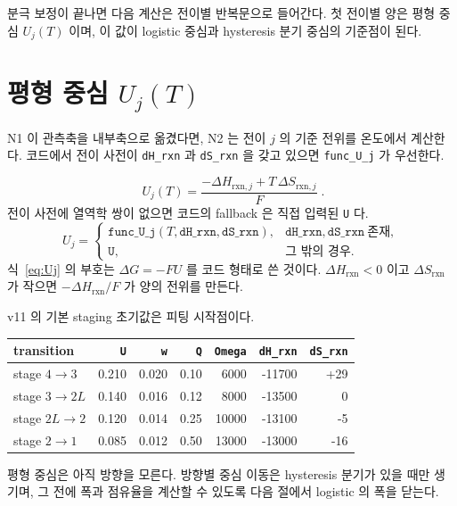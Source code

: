 \documentclass[11pt,a4paper]{article}
\begin{document}
분극 보정이 끝나면 다음 계산은 전이별 반복문으로 들어간다. 첫 전이별 양은 평형 중심 $U_j(T)$ 이며, 이 값이 logistic 중심과 hysteresis 분기 중심의 기준점이 된다.

\section{평형 중심 $U_j(T)$}\label{sec:n2}
N1 이 관측축을 내부축으로 옮겼다면, N2 는 전이 $j$ 의 기준 전위를 온도에서 계산한다. 코드에서 전이 사전이 \texttt{dH\_rxn} 과 \texttt{dS\_rxn} 을 갖고 있으면 \texttt{func\_U\_j} 가 우선한다.

\begin{equation}
\boxed{\;U_j(T)=\frac{-\Delta H_{\mathrm{rxn},j}+T\,\Delta S_{\mathrm{rxn},j}}{F}\;.}
\label{eq:Uj}
\end{equation}
전이 사전에 열역학 쌍이 없으면 코드의 fallback 은 직접 입력된 \texttt{U} 다.
\begin{equation}
U_j=
\begin{cases}
\texttt{func\_U\_j}(T,\texttt{dH\_rxn},\texttt{dS\_rxn}),& \texttt{dH\_rxn},\texttt{dS\_rxn}\ \text{존재},\\
\texttt{U},&\text{그 밖의 경우}.
\end{cases}
\label{eq:Udispatch}
\end{equation}
식~\eqref{eq:Uj} 의 부호는 $\Delta G=-FU$ 를 코드 형태로 쓴 것이다. $\Delta H_{\mathrm{rxn}}<0$ 이고 $\Delta S_{\mathrm{rxn}}$ 가 작으면 $-\Delta H_{\mathrm{rxn}}/F$ 가 양의 전위를 만든다.

v11 의 기본 staging 초기값은 피팅 시작점이다.
\begin{center}
\renewcommand{\arraystretch}{1.25}
\begin{tabular}{lrrrrrr}
\toprule
transition & \texttt{U} & \texttt{w} & \texttt{Q} & \texttt{Omega} & \texttt{dH\_rxn} & \texttt{dS\_rxn}\\
\midrule
stage $4\to3$ & 0.210 & 0.020 & 0.10 & 6000 & -11700 & +29\\
stage $3\to2L$ & 0.140 & 0.016 & 0.12 & 8000 & -13500 & 0\\
stage $2L\to2$ & 0.120 & 0.014 & 0.25 & 10000 & -13100 & -5\\
stage $2\to1$ & 0.085 & 0.012 & 0.50 & 13000 & -13000 & -16\\
\bottomrule
\end{tabular}
\end{center}
평형 중심은 아직 방향을 모른다. 방향별 중심 이동은 hysteresis 분기가 있을 때만 생기며, 그 전에 폭과 점유율을 계산할 수 있도록 다음 절에서 logistic 의 폭을 닫는다.
\end{document}
